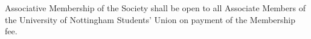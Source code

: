 \begin{clause}  
  Associative Membership of the Society shall be open to all Associate Members of the University of Nottingham Students' Union on payment of the Membership fee.
\end{clause}